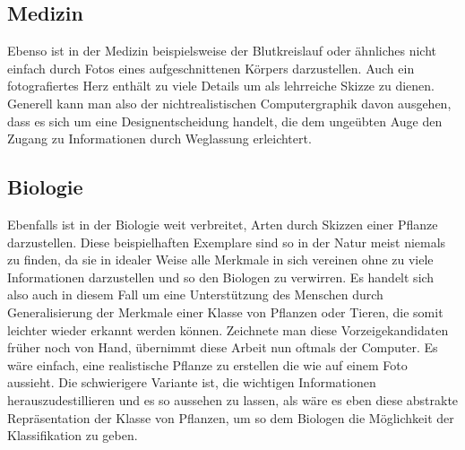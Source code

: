 \subsection{Medizin}
Ebenso ist in der Medizin beispielsweise der Blutkreislauf oder ähnliches nicht 
einfach durch Fotos eines aufgeschnittenen Körpers darzustellen. Auch ein 
fotografiertes Herz enthält zu viele Details um als lehrreiche Skizze zu dienen.
 Generell kann man also der nichtrealistischen Computergraphik davon ausgehen, 
dass es sich um eine Designentscheidung handelt, die dem ungeübten Auge den 
Zugang zu Informationen durch Weglassung erleichtert.

\subsection{Biologie}
Ebenfalls ist in der Biologie weit verbreitet, Arten durch Skizzen einer 
Pflanze darzustellen. Diese beispielhaften Exemplare sind so in der Natur meist 
niemals zu finden, da sie in idealer Weise alle Merkmale in sich vereinen ohne 
zu viele Informationen darzustellen und so den Biologen zu verwirren. Es handelt
 sich also auch in diesem Fall um eine Unterstützung des Menschen durch 
Generalisierung der Merkmale einer Klasse von Pflanzen oder Tieren, die somit 
leichter wieder erkannt werden können. Zeichnete man diese Vorzeigekandidaten 
früher noch von Hand, übernimmt diese Arbeit nun oftmals der Computer. Es wäre 
einfach, eine realistische Pflanze zu erstellen die wie auf einem Foto 
aussieht. Die schwierigere Variante ist, die wichtigen Informationen 
herauszudestillieren und es so aussehen zu lassen, als wäre es eben diese 
abstrakte Repräsentation der Klasse von Pflanzen, um so dem Biologen die 
Möglichkeit der Klassifikation zu geben.

